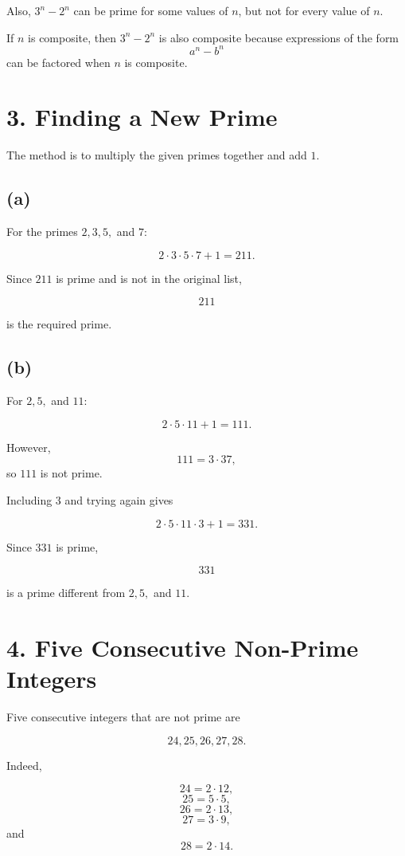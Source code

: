 \documentclass[12pt]{article}
\begin{document}
Also, $3^n-2^n$ can be prime for some values of $n$, but not for every value of $n$.

If $n$ is composite, then $3^n-2^n$ is also composite because expressions of the form
\[
a^n-b^n
\]
can be factored when $n$ is composite.

\section*{3. Finding a New Prime}

The method is to multiply the given primes together and add $1$.

\subsection*{(a)}

For the primes $2,3,5,$ and $7$:

\[
2\cdot3\cdot5\cdot7+1=211.
\]

Since $211$ is prime and is not in the original list,

\[
\boxed{211}
\]

is the required prime.

\subsection*{(b)}

For $2,5,$ and $11$:

\[
2\cdot5\cdot11+1=111.
\]

However,
\[
111=3\cdot37,
\]
so $111$ is not prime.

Including $3$ and trying again gives

\[
2\cdot5\cdot11\cdot3+1=331.
\]

Since $331$ is prime,

\[
\boxed{331}
\]

is a prime different from $2,5,$ and $11$.

\section*{4. Five Consecutive Non-Prime Integers}

Five consecutive integers that are not prime are

\[
\boxed{24,25,26,27,28}.
\]

Indeed,

\[
24=2\cdot12,
\]
\[
25=5\cdot5,
\]
\[
26=2\cdot13,
\]
\[
27=3\cdot9,
\]
and
\[
28=2\cdot14.
\]
\end{document}
